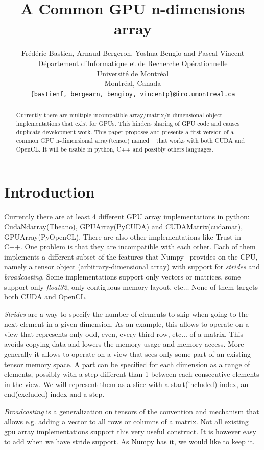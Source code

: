 \documentclass{article} %
\title{A Common GPU n-dimensions array}
\author{
Frédéric Bastien, Arnaud Bergeron, Yoshua Bengio and Pascal Vincent \\
D\'epartement d'Informatique et de Recherche Op\'erationnelle\\
Universit\'e de Montr\'eal\\
Montr\'eal, Canada \\
\texttt{\{bastienf, bergearn, bengioy, vincentp\}@iro.umontreal.ca} \\
}
\begin{document}
\maketitle

\begin{abstract}
Currently there are multiple incompatible array/matrix/n-dimensional object implementations
that exist for GPUs. This hinders sharing of GPU code and causes
duplicate development work. This paper proposes and presents a
first version of a common GPU n-dimensional
array(tensor) named ~\citep{GpuNdArray} that works with both CUDA and OpenCL. 
It will be usable in python, C++ and possibly others languages.
\end{abstract}

\section{Introduction}
Currently there are at least 4 different GPU array implementations in python:
CudaNdarray(Theano), GPUArray(PyCUDA) and CUDAMatrix(cudamat), %
GPUArray(PyOpenCL). There are also other implementations like Trust in
C++. One problem is that they are incompatible with each
other. Each of them implements a different subset of the features that 
Numpy~\citep{numpy-2007} provides on the CPU, namely a tensor object (arbitrary-dimensional array) with support for \emph{strides} and \emph{broadcasting}.
Some implementations support only vectors or matrices, some support only \emph{float32}, only contiguous memory layout, etc$\ldots$
None of them targets both CUDA and OpenCL.

\emph{Strides} are a way to specify the number of elements to skip when going
to the next element in a given dimension. As an example, this allows
to operate on a view that represents only odd, even, every third row, etc$\ldots$ of
a matrix. This avoids copying data and lowers the memory usage and memory
access. More generally it allows to operate on a view that sees only some part of an existing tensor
memory space. A part can be
specified for each dimension as a range of elements, possibly with a
step different than 1 between each consecutive elements in the
view. We will represent them as a slice with a start(included) index, an
end(excluded) index and a step.

\emph{Broadcasting} is a generalization on tensors of the convention and mechanism that allows e.g. adding a
vector to all rows or columns of a matrix. Not all existing gpu array implementations
support this very useful construct. It is however easy to add when we have
stride support. As Numpy has it, we would like to keep it.
\end{document}
